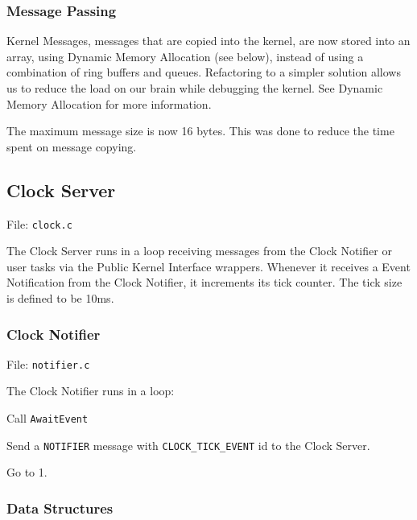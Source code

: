\documentclass[letterpaper]{article}
\begin{document}
\subsubsection{Message Passing%
  \label{message-passing}%
}

Kernel Messages, messages that are copied into the kernel, are now stored into an array, using Dynamic Memory Allocation (see below), instead of using a combination of ring buffers and queues. Refactoring to a simpler solution allows us to reduce the load on our brain while debugging the kernel. See Dynamic Memory Allocation for more information.

The maximum message size is now 16 bytes. This was done to reduce the time spent on message copying.


\subsection{Clock Server%
  \label{clock-server}%
}

File: \texttt{clock.c}

The Clock Server runs in a loop receiving messages from the Clock Notifier or user tasks via the Public Kernel Interface wrappers. Whenever it receives a Event Notification from the Clock Notifier, it increments its tick counter. The tick size is defined to be 10ms.


\subsubsection{Clock Notifier%
  \label{clock-notifier}%
}

File: \texttt{notifier.c}

The Clock Notifier runs in a loop:
\begin{list}{.}
{
\setlength{\rightmargin}{\leftmargin}
}

\item Call \texttt{AwaitEvent}

\item Send a \texttt{NOTIFIER} message with \texttt{CLOCK\_TICK\_EVENT} id to the Clock Server.

\item Go to 1.
\end{list}


\subsubsection{Data Structures%
  \label{data-structures}%
}
\end{document}
